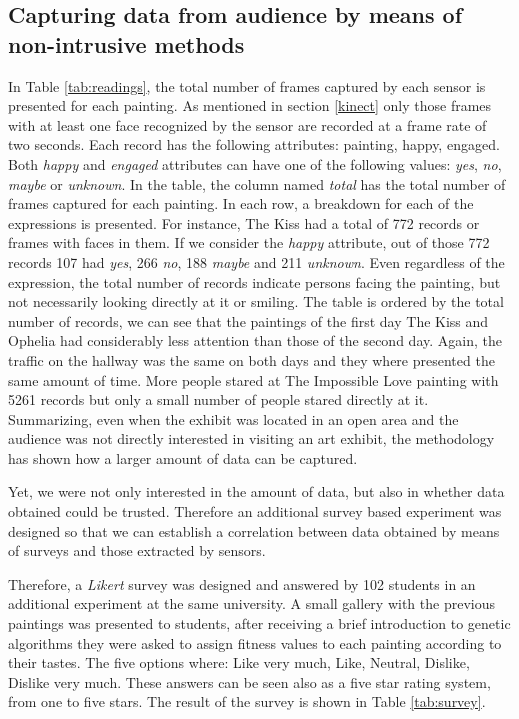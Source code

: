 \documentclass[graybox]{svmult}
\begin{document}
\subsection{Capturing data from audience by means of non-intrusive methods}
In Table \ref{tab:readings}, the total number of frames captured by each sensor is presented for each painting. As mentioned in section \ref{kinect} only those frames with at least one face recognized by the sensor are recorded at a frame rate of two seconds. Each record has the following attributes: painting, happy, engaged. Both \textit{happy} and \textit{engaged} attributes can have one of the following values: \textit{yes}, \textit{no}, \textit{maybe} or \textit{unknown}.  In the table, the column named \textit{total} has the total number of frames captured for each painting. In each row, a breakdown for each of the expressions is presented. For instance, The Kiss had a total of 772 records or frames with faces in them. If we consider the \textit{happy} attribute, out of those 772 records 107 had \textit{yes}, 266 \textit{no}, 188  \textit{maybe} and 211 \textit{unknown}. Even regardless of the expression, the total number of records indicate persons facing the painting, but not necessarily looking directly at it or smiling. The table is ordered by the total number of records, we can see that the paintings of the first day The Kiss and Ophelia had considerably less attention than those of the second day. Again, the traffic on the hallway was the same on both days and they where presented the same amount of time. More people stared at The Impossible Love painting with 5261 records but only a small number of people stared directly at it.  Summarizing, even when the exhibit was located in an open area and the audience was not directly interested in visiting an art exhibit, the methodology has shown how a larger amount of data can be captured.

Yet, we were not only interested in the amount of data, but also in whether data obtained could be trusted.  Therefore an additional survey based experiment was designed so that we can establish a correlation between data obtained by means of surveys and those extracted by sensors.

Therefore, a \textit{Likert} survey was designed and answered by 102 students in an additional experiment at the same university. A small gallery with the previous paintings was presented to students, after receiving a brief introduction to genetic algorithms they were asked to assign fitness values to each painting according to their tastes. The five options where: Like very much, Like, Neutral, Dislike, Dislike very much. These answers can be seen also as a five star rating system, from one to five stars. The result of the survey is shown in Table \ref{tab:survey}.
\end{document}
